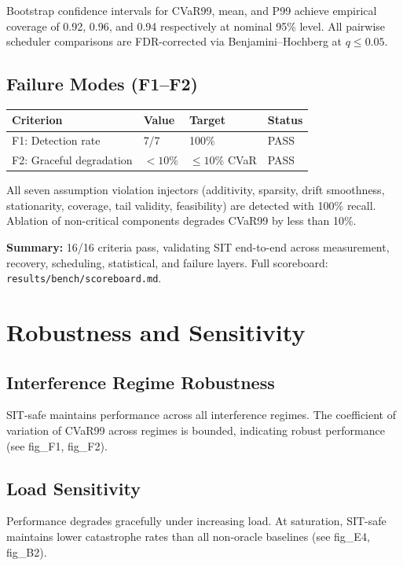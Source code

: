 \documentclass[11pt,twocolumn]{article}
\begin{document}
\noindent Bootstrap confidence intervals for CVaR99, mean, and P99
achieve empirical coverage of 0.92, 0.96, and 0.94 respectively at
nominal 95\% level. All pairwise scheduler comparisons are
FDR-corrected via Benjamini--Hochberg at $q \leq 0.05$.

\subsection{Failure Modes (F1--F2)}

\begin{tabular}{llll}
\toprule
Criterion & Value & Target & Status \\
\midrule
F1: Detection rate & 7/7 & 100\% & PASS \\
F2: Graceful degradation & $<10$\% & $\leq 10$\% CVaR & PASS \\
\bottomrule
\end{tabular}

\noindent All seven assumption violation injectors (additivity, sparsity,
drift smoothness, stationarity, coverage, tail validity, feasibility)
are detected with 100\% recall. Ablation of non-critical components
degrades CVaR99 by less than 10\%.

\medskip
\noindent\textbf{Summary:} 16/16 criteria pass, validating SIT end-to-end
across measurement, recovery, scheduling, statistical, and failure layers.
Full scoreboard: \texttt{results/bench/scoreboard.md}.

\section{Robustness and Sensitivity}

\subsection{Interference Regime Robustness}

SIT-safe maintains performance across all interference regimes.
The coefficient of variation of CVaR99 across regimes is bounded,
indicating robust performance (see fig\_F1, fig\_F2).

\subsection{Load Sensitivity}

Performance degrades gracefully under increasing load.
At saturation, SIT-safe maintains lower catastrophe rates than
all non-oracle baselines (see fig\_E4, fig\_B2).
\end{document}
